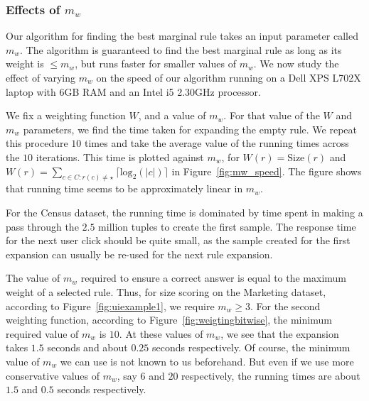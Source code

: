 \subsubsection{Effects of $m_w$}
Our algorithm for finding the best marginal rule takes an input parameter called $m_w$. The algorithm is guaranteed to find the best marginal rule as long as its weight is $\leq m_w$, but runs faster for smaller values of $m_w$. We now study the effect of varying $m_w$ on the speed of our algorithm running on a Dell XPS L702X laptop with 6GB RAM and an Intel i5 2.30GHz processor.

We fix a weighting function $W$, and a value of $m_w$. For that value of the $W$ and $m_w$ parameters, we find the time taken for expanding the empty rule. We repeat this procedure $10$ times and take the average value of the running times across the $10$ iterations. This time is plotted against $m_w$, for $W(r) = \text{Size}(r)$ and $W(r) = \sum_{c \in C : r(c) \neq \star} \lceil \text{log}_2(|c|) \rceil$ in Figure~\ref{fig:mw_speed}. The figure shows that running time seems to be approximately linear in $m_w$. 

For the Census dataset, the running time is dominated by time spent in making a pass through the $2.5$ million tuples to create the first sample. The response time for the next user click should be quite small, as the sample created for the first expansion can usually be re-used for the next rule expansion.

The value of $m_w$ required to ensure a correct answer is equal to the maximum weight of a selected rule. Thus, for size scoring on the Marketing dataset, according to Figure~\ref{fig:uiexample1}, we require $m_w \geq 3$. For the second weighting function, according to Figure~\ref{fig:weigtingbitwise}, the minimum required value of $m_w$ is $10$. At these values of $m_w$, we see that the expansion takes $1.5$ seconds and about $0.25$ seconds respectively. Of course, the minimum value of $m_w$ we can use is not known to us beforehand. But even if we use more conservative values of $m_w$, say $6$ and $20$ respectively, the running times are about $1.5$ and $0.5$ seconds respectively.

